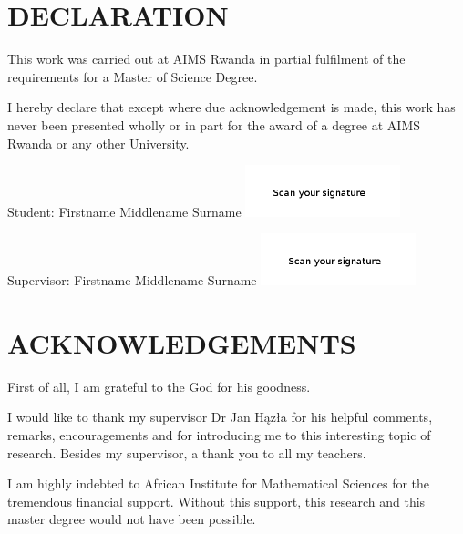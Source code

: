 \chapter*{DECLARATION}
This work was carried out at AIMS Rwanda in partial fulfilment of the requirements for a Master of Science Degree.

I hereby declare that except where due acknowledgement is made, this work has never been presented wholly or in part for the award of a degree at AIMS Rwanda or any other University.

\vspace{1.5cm}
Student: Firstname Middlename Surname \includegraphics[height=1.5cm]{images/signature.png}

\vspace{1.5cm}

Supervisor: Firstname Middlename Surname \includegraphics[height=1.5cm]{images/signature1.png}


\newpage

\chapter*{ACKNOWLEDGEMENTS}

First of all,  I am grateful to the God for his goodness.

I would like to thank my supervisor Dr Jan H{\k{a}}z{\l}a for his helpful comments, remarks, encouragements and for introducing me to this interesting topic of research. Besides my supervisor, a thank you to all my teachers.

I am highly indebted to African Institute for Mathematical Sciences for  the tremendous  financial support. Without this support,  this research and this master degree would not have been possible.

